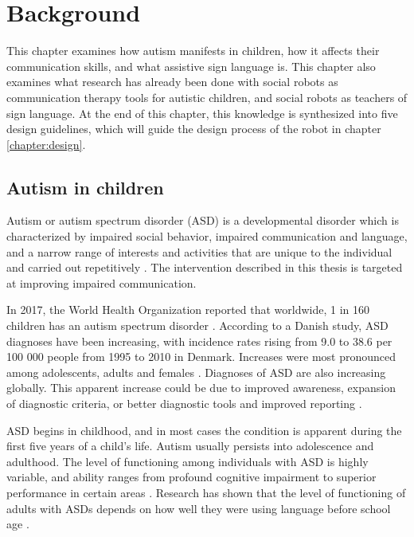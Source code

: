\chapter{Background}
\label{chapter:background} 


This chapter examines how autism manifests in children, how it affects their communication skills, and what assistive sign language is. This chapter also examines what research has already been done with social robots as communication therapy tools for autistic children, and social robots as teachers of sign language. At the end of this chapter, this knowledge is synthesized into five design guidelines, which will guide the design process of the robot in chapter \ref{chapter:design}.




\section{Autism in children}


Autism or autism spectrum disorder (ASD) is a developmental disorder which is characterized by impaired social behavior, impaired communication and language, and a narrow range of interests and activities that are unique to the individual and carried out repetitively \cite{WHOautism}.  The intervention described in this thesis is targeted at improving impaired communication.

In 2017, the World Health Organization reported that worldwide, 1 in 160 children has an autism spectrum disorder \cite{WHOautism}. According to a Danish study, ASD diagnoses have been increasing, with incidence rates rising from 9.0 to 38.6 per 100 000 people from 1995 to 2010 in Denmark. Increases were most pronounced among adolescents, adults and females \cite{jensen2014time}. Diagnoses of ASD are also increasing globally. This apparent increase could be due to improved awareness, expansion of diagnostic criteria, or better diagnostic tools and improved reporting \cite{WHOautism}.

ASD begins in childhood, and in most cases the condition is apparent during the first five years of a child's life. Autism usually persists into adolescence and adulthood. The level of functioning among individuals with ASD is highly variable, and ability ranges from profound cognitive impairment to superior performance in certain areas \cite{WHOautism}. Research has shown that the level of functioning of adults with ASDs depends on how well they were using language before school age \cite{tetzchner}.

